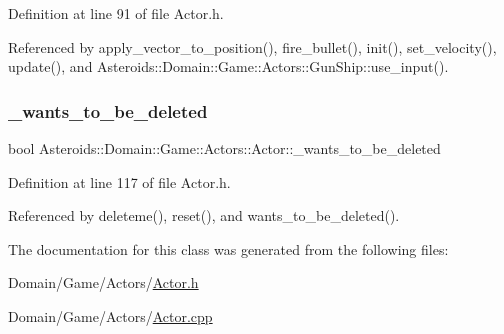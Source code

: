 Definition at line 91 of file Actor.\+h.



Referenced by apply\+\_\+vector\+\_\+to\+\_\+position(), fire\+\_\+bullet(), init(), set\+\_\+velocity(), update(), and Asteroids\+::\+Domain\+::\+Game\+::\+Actors\+::\+Gun\+Ship\+::use\+\_\+input().

\mbox{\label{classAsteroids_1_1Domain_1_1Game_1_1Actors_1_1Actor_ad9bc276327b7126b38065d2a0d9c878d}} 
\subsubsection{\texorpdfstring{\+\_\+wants\+\_\+to\+\_\+be\+\_\+deleted}{\_wants\_to\_be\_deleted}}
{\footnotesize\ttfamily bool Asteroids\+::\+Domain\+::\+Game\+::\+Actors\+::\+Actor\+::\+\_\+wants\+\_\+to\+\_\+be\+\_\+deleted\hspace{0.3cm}{\ttfamily [private]}}



Definition at line 117 of file Actor.\+h.



Referenced by deleteme(), reset(), and wants\+\_\+to\+\_\+be\+\_\+deleted().



The documentation for this class was generated from the following files\+:\begin{DoxyCompactItemize}
\item 
Domain/\+Game/\+Actors/\hyperlink{Actor_8h}{Actor.\+h}\item 
Domain/\+Game/\+Actors/\hyperlink{Actor_8cpp}{Actor.\+cpp}\end{DoxyCompactItemize}
